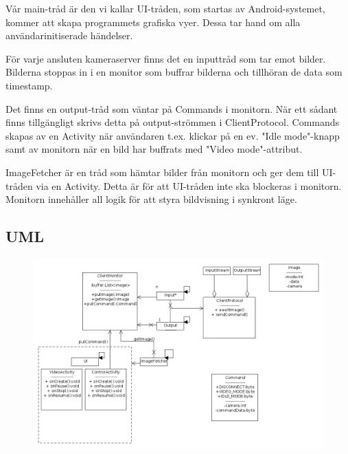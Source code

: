 \documentclass[a4paper]{article}
\begin{document}
Vår main-tråd är den vi kallar UI-tråden, som startas av Android-systemet, kommer att skapa programmets grafiska vyer. Dessa tar hand om alla användarinitiserade händelser. 

För varje ansluten kameraserver finns det en inputtråd som tar emot bilder. Bilderna stoppas in i en monitor som buffrar bilderna och tillhöran de data som timestamp.

Det finns en output-tråd som väntar på Commands i monitorn. När ett sådant finns tillgängligt skrivs detta på output-strömmen i ClientProtocol. Commands skapas av en Activity när användaren t.ex. klickar på en ev. "Idle mode"-knapp samt av monitorn när en bild har buffrats med "Video mode"-attribut.

ImageFetcher är en tråd som hämtar bilder från monitorn och ger dem till UI-tråden via en Activity. Detta är för att UI-tråden inte ska blockeras i monitorn. Monitorn innehåller all logik för att styra bildvisning i synkront läge. 

\newpage
\subsection{UML}
\begin{figure}[htb]
\includegraphics[scale=0.4]{uml_client.png}
\end{figure}
\end{document}
